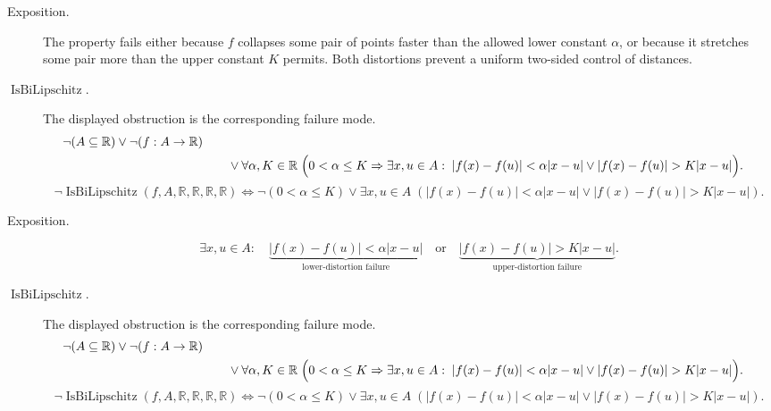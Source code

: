 \begin{remark*}
\begin{description}
  \item[Exposition.]
The property fails either because $f$ collapses some pair of points faster than the allowed lower constant $\alpha$, or because it stretches some pair more than the upper constant $K$ permits. Both distortions prevent a uniform two-sided control of distances.


  \item[\(\operatorname{IsBiLipschitz}.\)]
  The displayed obstruction is the corresponding failure mode.
  \[
\begin{aligned}
\neg(A\subseteq\mathbb{R})\lor\neg(f:A\to\mathbb{R})\\
&\qquad\lor
\forall \alpha,K\in\mathbb{R}\;\Bigl(0<\alpha\le K \Rightarrow
\exists x,u\in A:\; |f(x)-f(u)|<\alpha|x-u| \lor |f(x)-f(u)|>K|x-u|\Bigr).
\end{aligned}
  \]
  \[
\neg\operatorname{IsBiLipschitz}(f,A,\mathbb{R},\mathbb{R},\mathbb{R},\mathbb{R}) \Longleftrightarrow \neg(0<\alpha\le K) \lor \exists x,u\in A\; \left(|f(x)-f(u)|<\alpha|x-u| \lor |f(x)-f(u)|>K|x-u|\right).
  \]
\end{description}
\end{remark*}

\begin{remark*}
\begin{description}
  \item[Exposition.]
\[
\exists x,u\in A:\quad
\underbrace{|f(x)-f(u)|<\alpha|x-u|}_{\text{lower-distortion failure}}
\quad\text{or}\quad
\underbrace{|f(x)-f(u)|>K|x-u|}_{\text{upper-distortion failure}}.
\]


  \item[\(\operatorname{IsBiLipschitz}.\)]
  The displayed obstruction is the corresponding failure mode.
  \[
\begin{aligned}
\neg(A\subseteq\mathbb{R})\lor\neg(f:A\to\mathbb{R})\\
&\qquad\lor
\forall \alpha,K\in\mathbb{R}\;\Bigl(0<\alpha\le K \Rightarrow
\exists x,u\in A:\; |f(x)-f(u)|<\alpha|x-u| \lor |f(x)-f(u)|>K|x-u|\Bigr).
\end{aligned}
  \]
  \[
\neg\operatorname{IsBiLipschitz}(f,A,\mathbb{R},\mathbb{R},\mathbb{R},\mathbb{R}) \Longleftrightarrow \neg(0<\alpha\le K) \lor \exists x,u\in A\; \left(|f(x)-f(u)|<\alpha|x-u| \lor |f(x)-f(u)|>K|x-u|\right).
  \]
\end{description}
\end{remark*}

